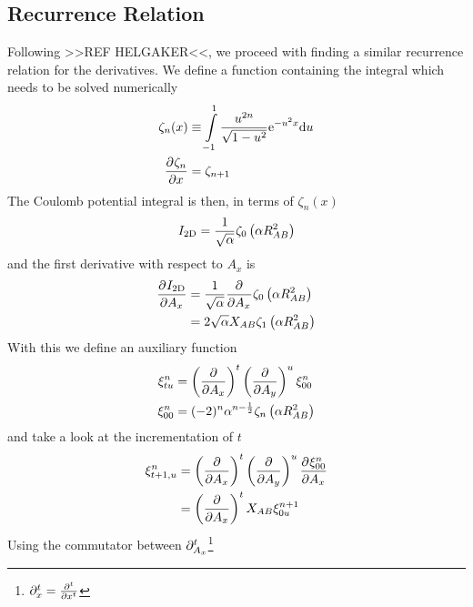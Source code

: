\subsection{Recurrence Relation\label{sub:445}}
    Following >>REF HELGAKER<<, we proceed with finding a similar recurrence
    relation for the derivatives. We define a function containing the integral
    which needs to be solved numerically
        \begin{equation}
            \begin{aligned}
                \zeta_n(x) &\equiv \int\limits^1_{-1} \frac{u^{2n}}{\sqrt{1 -
                u^2}} \me^{-u^2x} \md u \\
                \prd{x}[\zeta_n] &= \zeta_{n+1}
            \end{aligned}
            \label{eq:zetaDef}
        \end{equation}
    The Coulomb potential integral is then, in terms of $\zeta_n(x)$
        \begin{equation}
            I_{\text{2D}} = \frac{1}{\sqrt{\alpha}} \zeta_0\left(\alpha R^2_{AB}\right)
        \end{equation}
    and the first derivative with respect to $A_x$ is
        \begin{align}
            \prd{A_x}[\twoDI] &= \frac{1}{\sqrt{\alpha}} \prd{A_x}
            \zeta_0\left(\alpha R^2_{AB}\right) \nonumber \\
            &= 2\sqrt{\alpha}X_{AB}\zeta_1\left(\alpha R^2_{AB}\right)
        \end{align}
    With this we define an auxiliary function
        \begin{equation}
            \begin{aligned}
                \xi^n_{tu} &=\left(\frac{\mathrm{\partial}}{\mathrm{\partial} A_x}\right)^{t}\left(\frac{\mathrm{\partial}}{\mathrm{\partial} A_y}\right)^{u} \xi^n_{00} \\
                \xi^n_{00} &= (-2)^n\alpha^{n-\frac{1}{2}} \zeta_n\left(\alpha
                R^2_{AB}\right)
            \end{aligned}
        \end{equation}
    and take a look at the incrementation of $t$
        \begin{align}
            \xi^n_{t+1,u} &= \prdp{A_x}{t}\prdp{A_y}{u} \prd{A_x}[\xi^n_{00}]
            \nonumber \\
            &= \prdp{A_x}{t}X_{AB}\xi^{n+1}_{0u}
            \label{eq:Rtincr}
        \end{align}
    Using the commutator between
    $\mathrm{\partial}^t_{A_x}$\footnote{$\prtl^t_x=\prd{x}[][t]$}

